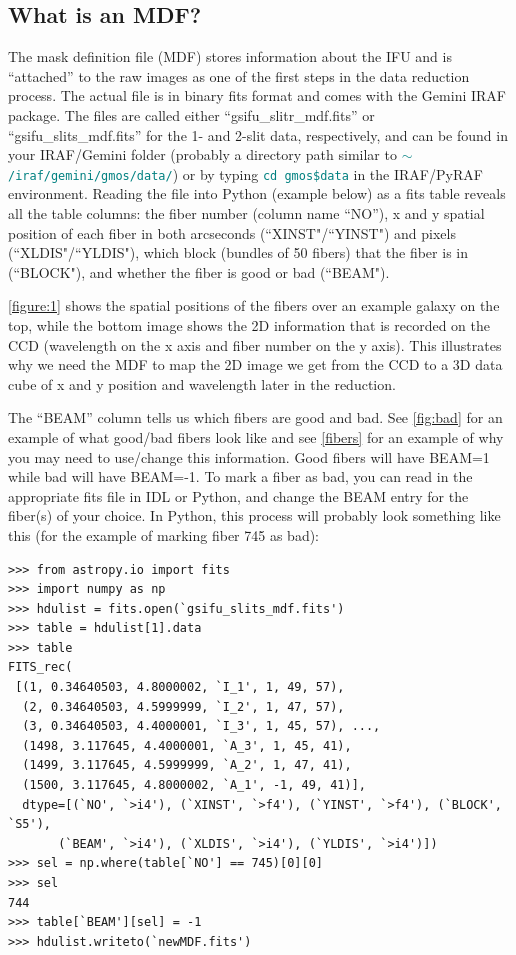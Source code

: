 \documentclass[12pt]{report}
\newcommand{\ty}[1]{\textcolor{teal}{\texttt{#1}}}
\begin{document}
\subsection{What is an MDF?}
The mask definition file (MDF) stores information about the IFU and is ``attached'' to the raw images as one of the first steps in the data reduction process. The actual file is in binary fits format and comes with the Gemini IRAF package. The files are called either ``gsifu\_slitr\_mdf.fits'' or ``gsifu\_slits\_mdf.fits'' for the 1- and 2-slit data, respectively, and can be found in your IRAF/Gemini folder (probably a directory path similar to \ty{$\sim$/iraf/gemini/gmos/data/}) or by typing \ty{cd gmos\$data} in the IRAF/PyRAF environment. Reading the file into Python (example below) as a fits table reveals all the table columns: the fiber number (column name ``NO''), x and y spatial position of each fiber in both arcseconds (``XINST"/``YINST") and pixels (``XLDIS"/``YLDIS"), which block (bundles of 50 fibers) that the fiber is in (``BLOCK"), and whether the fiber is good or bad (``BEAM"). 

\autoref{figure:1} shows the spatial positions of the fibers over an example galaxy on the top, while the bottom image shows the 2D information that is recorded on the CCD (wavelength on the x axis and fiber number on the y axis). This illustrates why we need the MDF to map the 2D image we get from the CCD to a 3D data cube of x and y position and wavelength later in the reduction.

The ``BEAM'' column tells us which fibers are good and bad. See \autoref{fig:bad} for an example of what good/bad fibers look like and see \autoref{fibers} for an example of why you may need to use/change this information. Good fibers will have BEAM=1 while bad will have BEAM=-1. To mark a fiber as bad, you can read in the appropriate fits file in IDL or Python, and change the BEAM entry for the fiber(s) of your choice. In Python, this process will probably look something like this (for the example of marking fiber 745 as bad):

\begin{verbatim}
>>> from astropy.io import fits
>>> import numpy as np
>>> hdulist = fits.open(`gsifu_slits_mdf.fits')
>>> table = hdulist[1].data
>>> table
FITS_rec(
 [(1, 0.34640503, 4.8000002, `I_1', 1, 49, 57),
  (2, 0.34640503, 4.5999999, `I_2', 1, 47, 57),
  (3, 0.34640503, 4.4000001, `I_3', 1, 45, 57), ...,
  (1498, 3.117645, 4.4000001, `A_3', 1, 45, 41),
  (1499, 3.117645, 4.5999999, `A_2', 1, 47, 41),
  (1500, 3.117645, 4.8000002, `A_1', -1, 49, 41)], 
  dtype=[(`NO', `>i4'), (`XINST', `>f4'), (`YINST', `>f4'), (`BLOCK', `S5'),
  	   (`BEAM', `>i4'), (`XLDIS', `>i4'), (`YLDIS', `>i4')])
>>> sel = np.where(table[`NO'] == 745)[0][0]
>>> sel
744
>>> table[`BEAM'][sel] = -1
>>> hdulist.writeto(`newMDF.fits')
\end{verbatim}
\end{document}
